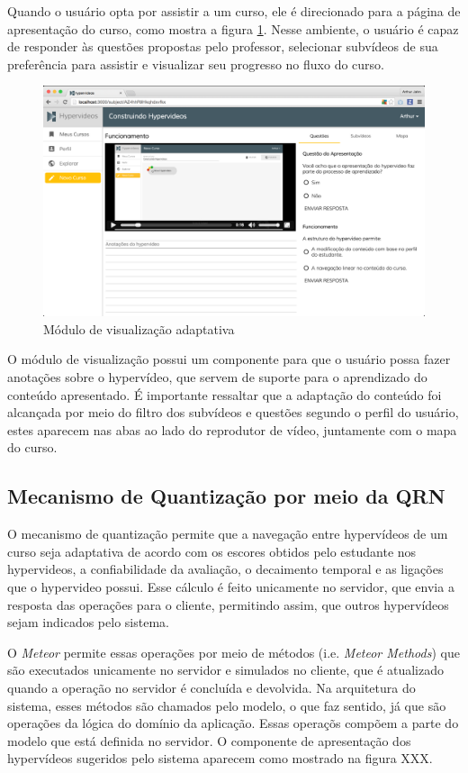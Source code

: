 Quando o usuário opta por assistir a um curso, ele é direcionado para a página de apresentação do curso, como mostra a figura \ref{fig:apresentar}. Nesse ambiente, o usuário é capaz de responder às questões propostas pelo professor, selecionar subvídeos de sua preferência para assistir e visualizar seu progresso no fluxo do curso.  

\begin{figure}[h!]
  	\centering
  	\includegraphics[width=.9\linewidth]{figuras/apresentar.eps}
  	\caption{Módulo de visualização adaptativa}
  	\label{fig:apresentar}
\end{figure}

O módulo de visualização possui um componente para que o usuário possa fazer anotações sobre o hypervídeo, que servem de suporte para o aprendizado do conteúdo apresentado. É importante ressaltar que a adaptação do conteúdo foi alcançada por meio do filtro dos subvídeos e questões segundo o perfil do usuário, estes aparecem nas abas ao lado do reprodutor de vídeo, juntamente com o mapa do curso.

\subsection{Mecanismo de Quantização por meio da QRN}

O mecanismo de quantização permite que a navegação entre hypervídeos de um curso seja adaptativa de acordo com os escores obtidos pelo estudante nos hypervideos, a confiabilidade da avaliação, o decaimento temporal e as ligações que o hypervideo possui. Esse cálculo é feito unicamente no servidor, que envia a resposta das operações para o cliente, permitindo assim, que outros hypervídeos sejam indicados pelo sistema. 

O \textit{Meteor} permite essas operações por meio de métodos (i.e. \textit{Meteor Methods}) que são executados unicamente no servidor e simulados no cliente, que é atualizado quando a operação no servidor é concluída e devolvida. Na arquitetura do sistema, esses métodos são chamados pelo modelo, o que faz sentido, já que são operações da lógica do domínio da aplicação. Essas operaçõs compõem a parte do modelo que está definida no servidor. O componente de apresentação dos hypervídeos sugeridos pelo sistema aparecem como mostrado na figura XXX.